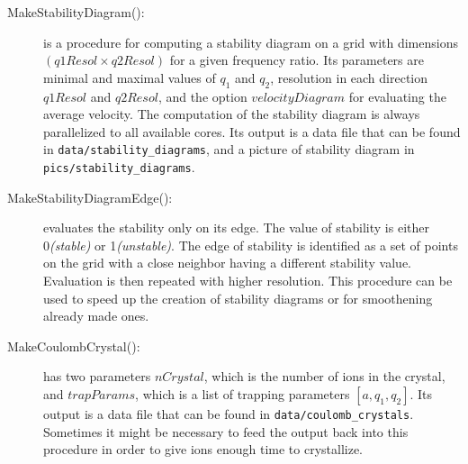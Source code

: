 \begin{description}
	\item[MakeStabilityDiagram():] is a procedure for computing a stability diagram on a grid with dimensions $(q1Resol \times q2Resol)$ for a given frequency ratio. Its parameters are minimal and maximal values of $q_1$ and $q_2$, resolution in each direction $q1Resol$ and $q2Resol$, and the option $velocityDiagram$ for evaluating the average velocity. The computation of the stability diagram is always parallelized to all available cores. Its output is a data file that can be found in \verb|data/stability_diagrams|, and a picture of stability diagram in \verb|pics/stability_diagrams|.
	\item[MakeStabilityDiagramEdge():] evaluates the stability only on its edge. The value of stability is either 0\textit{(stable)} or 1\textit{(unstable)}. The edge of stability is identified as a set of points on the grid with a close neighbor having a different stability value. Evaluation is then repeated with higher resolution. This procedure can be used to speed up the creation of stability diagrams or for smoothening already made ones.
	\item[MakeCoulombCrystal():] has two parameters $nCrystal$, which is the number of ions in the crystal, and $trapParams$, which is a list of trapping parameters $[a, q_1, q_2]$. Its output is a data file that can be found in \verb|data/coulomb_crystals|. Sometimes it might be necessary to feed the output back into this procedure in order to give ions enough time to crystallize.
\end{description}






